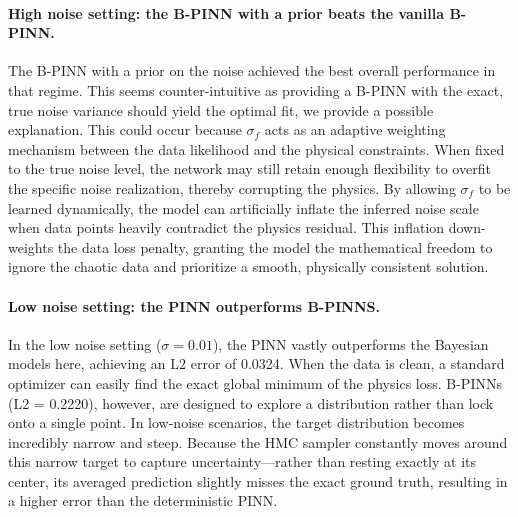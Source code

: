 \documentclass{article}
\begin{document}
\paragraph{High noise setting: the B-PINN with a prior beats the vanilla B-PINN.}
The B-PINN with a prior on the noise achieved the best overall performance in that regime. This seems counter-intuitive as providing a B-PINN with the exact, true noise variance should yield the optimal fit, we provide a possible explanation. This could occur  because $\sigma_f$ acts as an adaptive weighting mechanism between the data likelihood and the physical constraints.  When fixed to the true noise level, the network may still retain enough flexibility to overfit the specific noise realization, thereby corrupting the physics. By allowing $\sigma_f$ to be learned dynamically, the model can artificially inflate the inferred noise scale when data points heavily contradict the physics residual. This inflation down-weights the data loss penalty, granting the model the mathematical freedom to ignore the chaotic data and prioritize a smooth, physically consistent solution.


\paragraph{Low noise setting: the PINN outperforms B-PINNS.}  In the low noise setting ($\sigma = 0.01$), the PINN vastly outperforms the Bayesian models here, achieving an L2 error of 0.0324. When the data is clean, a standard optimizer can easily find the exact global minimum of the physics loss. 
B-PINNs (L2 = 0.2220), however, are designed to explore a distribution rather than lock onto a single point. In low-noise scenarios, the target distribution becomes incredibly narrow and steep. Because the HMC sampler constantly moves around this narrow target to capture uncertainty—rather than resting exactly at its center, its averaged prediction slightly misses the exact ground truth, resulting in a higher error than the deterministic PINN.
\end{document}
